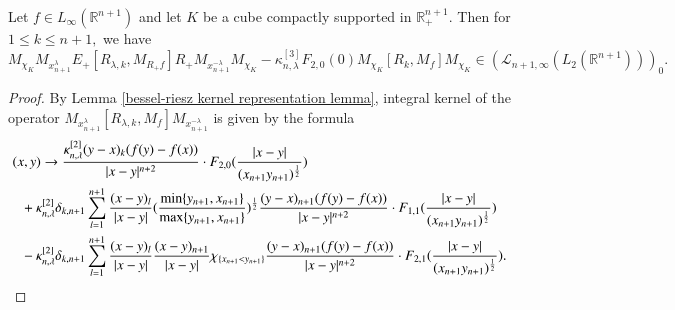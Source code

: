 \documentclass[12pt]{amsart}
\begin{document}
\begin{lemma}\label{mtb main lemma} Let $f\in L_{\infty}(\mathbb{R}^{n+1})$ and let $K$ be a cube compactly supported in $\mathbb{R}^{n+1}_+.$ Then for $1\leq k\leq n+1,$ we have
$$M_{\chi_K}M_{x_{n+1}^{\lambda}}E_+[R_{\lambda,k},M_{R_+f}]R_+M_{x_{n+1}^{-\lambda}}M_{\chi_K}-\kappa^{[3]}_{n,\lambda}F_{2,0}(0)M_{\chi_K}[R_k,M_f]M_{\chi_K}\in (\mathcal{L}_{n+1,\infty}(L_2(\mathbb{R}^{n+1})))_0.$$
\end{lemma}
\begin{proof} By Lemma \ref{bessel-riesz kernel representation lemma}, integral kernel of the operator $M_{x_{n+1}^{\lambda}}[R_{\lambda,k},M_f]M_{x_{n+1}^{-\lambda}}$ is given by the formula
\begin{align*}
(x,y)&\to\frac{\kappa^{[2]}_{n,\lambda}(y-x)_{k}(f(y)-f(x))}{|x-y|^{n+2}}\cdot F_{2,0}(\frac{|x-y|}{(x_{n+1}y_{n+1})^{\frac12}})\\
&\hspace{-0.5cm}+\kappa^{[2]}_{n,\lambda}\delta_{k,n+1}\sum_{l=1}^{n+1} \frac{(x-y)_l}{|x-y|}(\frac{\min\{y_{n+1},x_{n+1}\}}{\max\{y_{n+1},x_{n+1}\}})^{\frac12} \frac{(y-x)_{n+1}(f(y)-f(x))}{|x-y|^{n+2}}\cdot F_{1,1}(\frac{|x-y|}{(x_{n+1}y_{n+1})^{\frac12}})\\
&\hspace{-0.5cm}-\kappa^{[2]}_{n,\lambda}\delta_{k,n+1}\sum_{l=1}^{n+1} \frac{(x-y)_l}{|x-y|}\frac{(x-y)_{n+1}}{|x-y|}\chi_{\{x_{n+1}<y_{n+1}\}} \frac{(y-x)_{n+1}(f(y)-f(x))}{|x-y|^{n+2}}\cdot F_{2,1}(\frac{|x-y|}{(x_{n+1}y_{n+1})^{\frac12}}).
\end{align*}


\end{proof}
\end{document}
